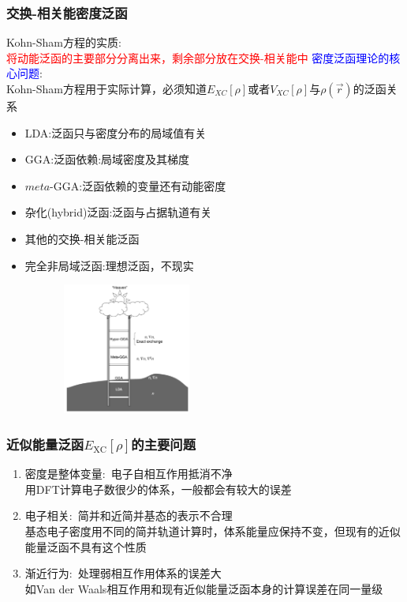 \documentclass[cjk,slidestop,compress,mathserif,blue]{beamer}
\begin{document}
\frame                               %
{
\frametitle{交换-相关能密度泛函}
\textrm{Kohn-Sham}方程的实质:\\\textcolor{red}{将动能泛函的主要部分分离出来，剩余部分放在交换-相关能中}
\vskip 5pt
\textcolor{blue}{密度泛函理论的核心问题}:\\
\textrm{Kohn-Sham}方程用于实际计算，必须知道$E_{XC}[\rho]$或者$V_{XC}[\rho]$与$\rho(\vec r)$的泛函关系
\vskip 6pt
\begin{minipage}[b]{0.59\textwidth}
 \hspace*{-12pt}
 {\fontsize{7.5pt}{6.0pt}\selectfont\begin{itemize}%
	 \setlength{\itemsep}{10pt}
 \item \textrm{LDA}:泛函只与密度分布的局域值有关
 \item \textrm{GGA}:泛函依赖:局域密度及其梯度
 \item $meta$-\textrm{GGA}:泛函依赖的变量还有动能密度
 \item 杂化(\textrm{hybrid})泛函:泛函与占据轨道有关
 \item 其他的交换-相关能泛函
 \item<1-> 完全非局域泛函:理想泛函，不现实
 \end{itemize}}
\end{minipage}
\hfill
\begin{minipage}[b]{0.39\textwidth}
\hspace*{-10pt}
\includegraphics[height=1.7in,width=3.18in,viewport=10 5 1380 700,clip]{Figures/Jacobi-ladder.png}\\
\end{minipage}
}

\frame                               %
{
	\frametitle{近似能量泛函$E_{\mathrm{XC}}[\rho]$的主要问题}
\vskip 20pt
\begin{enumerate}%
   \setlength{\itemsep}{10pt}
 \item  密度是整体变量:~电子自相互作用抵消不净\\%
	 用\textrm{DFT}计算电子数很少的体系，一般都会有较大的误差
 \item  电子相关:~简并和近简并基态的表示不合理\\
	 基态电子密度用不同的简并轨道计算时，体系能量应保持不变，但现有的近似能量泛函不具有这个性质
 \item  渐近行为:~处理弱相互作用体系的误差大\\
	 如\textrm{Van der Waals}相互作用和现有近似能量泛函本身的计算误差在同一量级
 \end{enumerate}
}
\end{document}

